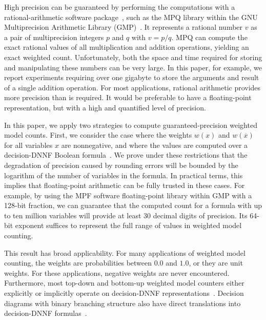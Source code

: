 \documentclass[letterpaper,USenglish,cleveref, autoref, thm-restate]{lipics-v2021}
\newcommand{\obar}[1]{\overline{#1}}
\begin{document}
High precision can be guaranteed by performing the
computations with a rational-arithmetic software package~\cite{knuth:rational:1981}, such as the
MPQ library within the GNU Multiprecision Arithmetic
Library (GMP)~\cite{granlund:gmp:2015}.  It represents a rational number $v$ as a
pair of multiprecision integers $p$ and $q$ with $v = p/q$.
MPQ
can compute the exact rational values of all multiplication and
addition operations, yielding an exact weighted count.  Unfortunately,
both the space and time required for storing and manipulating these numbers can be very
large.
In this paper, for example, we report experiments requiring over one gigabyte
to store the arguments and result of a single addition operation.
For most applications, rational arithmetic provides more precision than is required.
It would be preferable to have a floating-point
representation, but with a high and quantified level of precision.

In this paper, we apply two strategies to compute 
guaranteed-precision weighted model counts.  First, we consider the
case where the weights $w(x)$ and $w(\obar{x})$ for all variables $x$ are nonnegative, and
where the values are computed over a decision-DNNF Boolean
formula~\cite{beame:uai:2013,huang:jair:2007}.
We prove under these restrictions
that the degradation of
precision caused by rounding errors will be bounded by the logarithm
of the number of variables in the formula.  In practical terms, this
implies that floating-point arithmetic can be fully trusted in these
cases.  For example, by using the MPF software floating-point library
within GMP with a 128-bit fraction, we can guarantee that the computed
count for a formula with up to ten million variables will provide at least
30 decimal digits of precision.
Its 64-bit exponent suffices to represent the full range of values in weighted model counting.

This result has broad applicability.
For many applications
of weighted model counting, the weights are probabilities between
$0.0$ and $1.0$, or they are unit weights.  For these applications,  negative weights are never encountered.
Furthermore, most top-down and bottom-up weighted model
counters either explicitly or implicitly operate on decision-DNNF
representations~\cite{beame:uai:2013}.  
Decision diagrams with binary branching structure
also have direct translations into decision-DNNF formulas~\cite{huang:jair:2007,oztok:cp:2014}.
\end{document}
